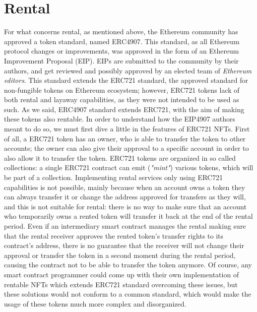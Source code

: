 \documentclass[english, LaM, oneside]{sapthesis}%
\begin{document}
\section{Rental}
For what concerns rental, as mentioned above, the Ethereum community has approved a token standard, named ERC4907\cite{ref:EIP4907}. This standard, as all Ethereum protocol changes or improvements, was approved in the form of an Ethereum Improvement Proposal (EIP). EIPs are submitted to the community by their authors, and get reviewed and possibly approved by an elected team of \textit{Ethereum editors}.\newline
This standard extends the ERC721 standard, the approved standard for non-fungible tokens on Ethereum ecosystem; however, ERC721 tokens lack of both rental and layaway capabilities, as they were not intended to be used as such.
As we said, ERC4907 standard extends ERC721, with the aim of making these tokens also rentable.\newline
In order to understand how the EIP4907 authors meant to do so, we must first dive a little in the features of ERC721 NFTs. First of all, a ERC721 token has an owner, who is able to transfer the token to other accounts; the owner can also give their approval to a specific account in order to also allow it to transfer the token. ERC721 tokens are organized in so called collections: a single ERC721 contract can emit (\textit{"mint"}) various tokens, which will be part of a collection. Implementing rental services only using ERC721 capabilities is not possible, mainly because when an account owns a token they can always transfer it or change the address approved for transfers as they will, and this is not suitable for rental: there is no way to make sure that an account who temporarily owns a rented token will transfer it back at the end of the rental period. Even if an intermediary smart contract manages the rental making sure that the rental receiver approves the rented token's transfer rights to its contract's address, there is no guarantee that the receiver will not change their approval or transfer the token in a second moment during the rental period, causing the contract not to be able to transfer the token anymore.\newline
Of course, any smart contract programmer could come up with their own implementation of rentable NFTs which extends ERC721 standard overcoming these issues, but these solutions would not conform to a common standard, which would make the usage of these tokens much more complex and disorganized.\newline
\end{document}
